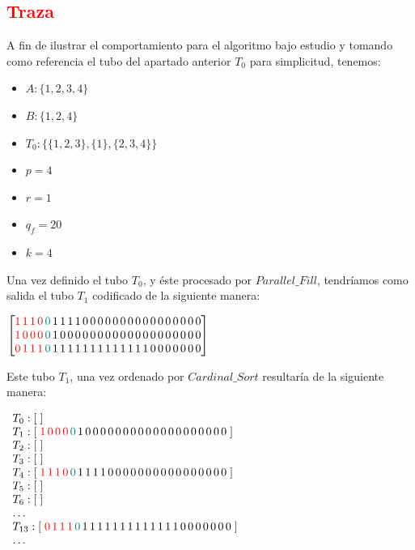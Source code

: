 \documentclass[12pt, letterpaper, twoside]{article}
\begin{document}
    \subsection{\textcolor{red}{Traza}}
    A fin de ilustrar el comportamiento para el algoritmo bajo estudio y tomando como referencia el tubo del apartado anterior $T_0$ para simplicitud, tenemos:
    \begin{multicols}{2}
        \begin{itemize}
        \item $A: \{1, 2, 3, 4\}$
        \item $B: \{1, 2, 4\}$
        \item $T_0: \{\{1,2,3\}, \{1\}, \{2,3,4\}\}$
        \item $p = 4$
        \item $r = 1$
        \item $q_f= 20$
        \item $k =4$
        \end{itemize}
    \end{multicols}


    Una vez definido el tubo $T_0$, y éste procesado por $Parallel\_Fill$, tendríamos como salida el tubo $T_1$ codificado de la siguiente manera:

    $
        \begin{bmatrix}
            \textcolor{red}{1\,1\,1\,0}\textcolor{teal}{\,0}\,1\,1\,1\,1\,0\,0\,0\,0\,0\,0\,0\,0\,0\,0\,0\,0\,0\,0\,0\,0\\
            \textcolor{red}{1\,0\,0\,0}\textcolor{teal}{\,0}\,1\,0\,0\,0\,0\,0\,0\,0\,0\,0\,0\,0\,0\,0\,0\,0\,0\,0\,0\,0 \\
            \textcolor{red}{0\,1\,1\,1}\textcolor{teal}{\,0}\,1\,1\,1\,1\,1\,1\,1\,1\,1\,1\,1\,1\,1\,0\,0\,0\,0\,0\,0\,0
        \end{bmatrix}
    $


    Este tubo $T_1$, una vez ordenado por $Cardinal\_Sort$ resultaría de la siguiente manera:

    $
    \begin{array}{l}
        T_0: [\;] \\
        T_1: [\;\textcolor{red}{1\,0\,0\,0}\textcolor{teal}{\,0}\,1\,0\,0\,0\,0\,0\,0\,0\,0\,0\,0\,0\,0\,0\,0\,0\,0\,0\,0\,0\;] \\
        T_2: [\;] \\
        T_3: [\;] \\
        T_4: [\;\textcolor{red}{1\,1\,1\,0}\textcolor{teal}{\,0}\,1\,1\,1\,1\,0\,0\,0\,0\,0\,0\,0\,0\,0\,0\,0\,0\,0\,0\,0\,0\;] \\
        T_5: [\;] \\
        T_6: [\;] \\
        \dots \\
        T_{13}: [\;\textcolor{red}{0\,1\,1\,1}\textcolor{teal}{\,0}\,1\,1\,1\,1\,1\,1\,1\,1\,1\,1\,1\,1\,1\,0\,0\,0\,0\,0\,0\,0\;] \\
        \dots
    \end{array}
    $ 
\end{document}
